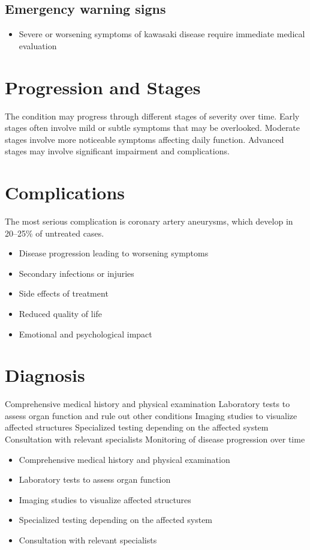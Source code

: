 \subsection{Emergency warning signs}
\begin{itemize}[noitemsep]
  \item Severe or worsening symptoms of kawasaki disease require immediate medical evaluation
\end{itemize}
\section{Progression and Stages}
The condition may progress through different stages of severity over time. Early stages often involve mild or subtle symptoms that may be overlooked. Moderate stages involve more noticeable symptoms affecting daily function. Advanced stages may involve significant impairment and complications.
\section{Complications}
The most serious complication is coronary artery aneurysms, which develop in 20--25\% of untreated cases.

\begin{itemize}[noitemsep]
  \item Disease progression leading to worsening symptoms
  \item Secondary infections or injuries
  \item Side effects of treatment
  \item Reduced quality of life
  \item Emotional and psychological impact
\end{itemize}
\section{Diagnosis}
Comprehensive medical history and physical examination Laboratory tests to assess organ function and rule out other conditions Imaging studies to visualize affected structures Specialized testing depending on the affected system Consultation with relevant specialists Monitoring of disease progression over time

\begin{itemize}[noitemsep]
  \item Comprehensive medical history and physical examination
  \item Laboratory tests to assess organ function
  \item Imaging studies to visualize affected structures
  \item Specialized testing depending on the affected system
  \item Consultation with relevant specialists
\end{itemize}
